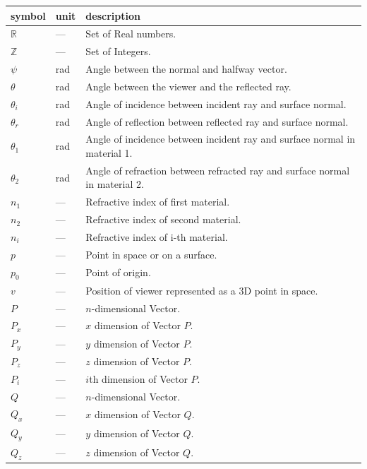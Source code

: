 \documentclass[12pt]{article}
\begin{document}
\noindent \begin{longtable*}{l l p{12cm}} \toprule
	\textbf{symbol} & \textbf{unit} & \textbf{description}\\
	\midrule 
	$\mathbb{R}$ & --- & Set of Real numbers.\\
	$\mathbb{Z}$ & --- & Set of Integers.\\
	$\psi$ & \si[per-mode=symbol] {\radian} & Angle between the normal and 
	halfway	vector.	\\
	$\theta$ & \si[per-mode=symbol] {\radian} & Angle between the viewer and the
	reflected ray.	\\
	$\theta_{i}$ & \si[per-mode=symbol] {\radian} & Angle of incidence
	between incident ray and surface normal. \\
	$\theta_{r}$ & \si[per-mode=symbol] {\radian} & Angle of reflection
	between reflected ray and surface normal.
	\\
	$\theta_{1}$ & \si[per-mode=symbol] {\radian} & Angle of incidence between
	incident ray and surface normal in material 1.
	\\
	$\theta_{2}$ & \si[per-mode=symbol] {\radian} & Angle of refraction between
	refracted ray and surface normal in material 2.
	\\
	$n_{1}$ & --- & Refractive index of first material.
	\\
	$n_{2}$ & --- & Refractive index of second material.
	\\
	$n_{i}$ & --- & Refractive index of i-th material.
	\\
	$p$ & --- & Point in space or on a surface.
	\\
	$p_{0}$ & --- & Point of origin.
	\\
	$v$ & --- & Position of viewer represented as a 3D point in space.
	\\
	$P$ & --- & $n$-dimensional Vector.
	\\
	$P_{x}$ & --- & $x$ dimension of Vector $P$.
	\\
	$P_{y}$ & --- & $y$ dimension of Vector $P$.
	\\
	$P_{z}$ & --- & $z$ dimension of Vector $P$.
	\\
	$P_{i}$ & --- & $i$th dimension of Vector $P$.
	\\
	$Q$ & --- & $n$-dimensional Vector.
	\\
	$Q_{x}$ & --- & $x$ dimension of Vector $Q$.
	\\
	$Q_{y}$ & --- & $y$ dimension of Vector $Q$.
	\\
	$Q_{z}$ & --- & $z$ dimension of Vector $Q$.

\end{longtable*}
\end{document}
